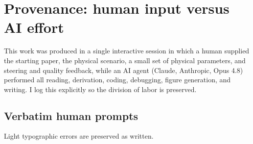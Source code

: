 \section{Provenance: human input versus AI effort}\label{app:provenance}
This work was produced in a single interactive session in which a human supplied the
starting paper, the physical scenario, a small set of physical parameters, and steering and
quality feedback, while an AI agent (Claude, Anthropic, Opus 4.8) performed all reading,
derivation, coding, debugging, figure generation, and writing. I log this explicitly so the
division of labor is preserved.

\subsection{Verbatim human prompts}
Light typographic errors are preserved as written.
